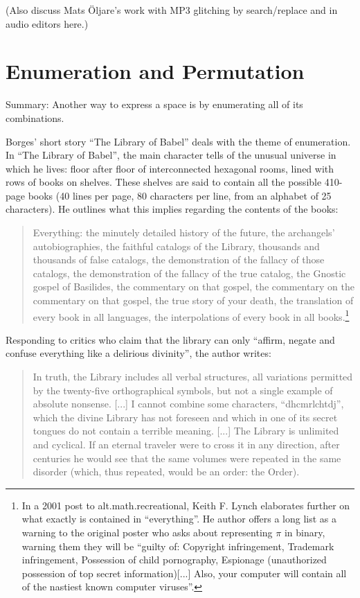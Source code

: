 \documentclass{thesis}
\begin{document}
	(Also discuss Mats \"Oljare's work with MP3 glitching by search/replace and in audio editors here.)
	
\section{Enumeration and Permutation}
	
	Summary: Another way to express a space is by enumerating all of its combinations.

	Borges' short story ``The Library of Babel''\cite{borges_library_2000} deals with the theme of enumeration.	In ``The Library of Babel'', the main character tells of the unusual universe in which he lives: floor after floor of interconnected hexagonal rooms, lined with rows of books on shelves. These shelves are said to contain all the possible 410-page books (40 lines per page, 80 characters per line, from an alphabet of 25 characters). He outlines what this implies regarding the contents of the books:
	
	\begin{quote}
	Everything: the minutely detailed history of the future, the archangels' autobiographies, the faithful catalogs of the Library, thousands and thousands of false catalogs, the demonstration of the fallacy of those catalogs, the demonstration of the fallacy of the true catalog, the Gnostic gospel of Basilides, the commentary on that gospel, the commentary on the commentary on that gospel, the true story of your death, the translation of every book in all languages, the interpolations of every book in all books.\footnote{In a 2001 post to alt.math.recreational, Keith F. Lynch elaborates further on what exactly is contained in ``everything''.\cite{keith_f._lynch_converting_????} He author offers a long list as a warning to the original poster who asks about representing $\pi$ in binary, warning them they will be ``guilty of: Copyright infringement, Trademark infringement, Possession of child pornography, Espionage (unauthorized possession of top secret information)[...] Also, your computer will contain all of the nastiest known computer viruses''.}
	\end{quote}
	
	Responding to critics who claim that the library can only ``affirm, negate and confuse everything like a delirious divinity'', the author writes:
	
	\begin{quote}
	In truth, the Library includes all verbal structures, all variations permitted by the twenty-five orthographical symbols, but not a single example of absolute nonsense. [...] I cannot combine some characters, ``dhcmrlchtdj'', which the divine Library has not foreseen and which in one of its secret tongues do not contain a terrible meaning. [...] The Library is unlimited and cyclical. If an eternal traveler were to cross it in any direction, after centuries he would see that the same volumes were repeated in the same disorder (which, thus repeated, would be an order: the Order).
	\end{quote}
	
\end{document}
